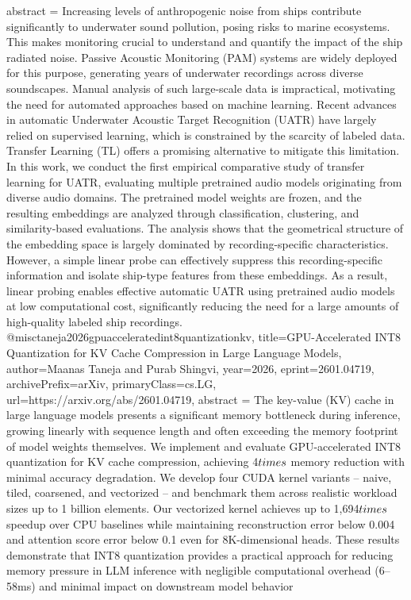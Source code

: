 {      abstract = {Increasing levels of anthropogenic noise from ships contribute significantly to underwater sound pollution, posing risks to marine ecosystems. This makes monitoring crucial to understand and quantify the impact of the ship radiated noise. Passive Acoustic Monitoring (PAM) systems are widely deployed for this purpose, generating years of underwater recordings across diverse soundscapes. Manual analysis of such large-scale data is impractical, motivating the need for automated approaches based on machine learning. Recent advances in automatic Underwater Acoustic Target Recognition (UATR) have largely relied on supervised learning, which is constrained by the scarcity of labeled data. Transfer Learning (TL) offers a promising alternative to mitigate this limitation. In this work, we conduct the first empirical comparative study of transfer learning for UATR, evaluating multiple pretrained audio models originating from diverse audio domains. The pretrained model weights are frozen, and the resulting embeddings are analyzed through classification, clustering, and similarity-based evaluations. The analysis shows that the geometrical structure of the embedding space is largely dominated by recording-specific characteristics. However, a simple linear probe can effectively suppress this recording-specific information and isolate ship-type features from these embeddings. As a result, linear probing enables effective automatic UATR using pretrained audio models at low computational cost, significantly reducing the need for a large amounts of high-quality labeled ship recordings.}
}@misc{taneja2026gpuacceleratedint8quantizationkv,
      title={GPU-Accelerated INT8 Quantization for KV Cache Compression in Large Language Models}, 
      author={Maanas Taneja and Purab Shingvi},
      year={2026},
      eprint={2601.04719},
      archivePrefix={arXiv},
      primaryClass={cs.LG},
      url={https://arxiv.org/abs/2601.04719},
      abstract = {The key-value (KV) cache in large language models presents a significant memory bottleneck during inference, growing linearly with sequence length and often exceeding the memory footprint of model weights themselves. We implement and evaluate GPU-accelerated INT8 quantization for KV cache compression, achieving 4$\\times$ memory reduction with minimal accuracy degradation. We develop four CUDA kernel variants -- naive, tiled, coarsened, and vectorized -- and benchmark them across realistic workload sizes up to 1 billion elements. Our vectorized kernel achieves up to 1,694$\\times$ speedup over CPU baselines while maintaining reconstruction error below 0.004 and attention score error below 0.1 even for 8K-dimensional heads. These results demonstrate that INT8 quantization provides a practical approach for reducing memory pressure in LLM inference with negligible computational overhead (6--58ms) and minimal impact on downstream model behavior}
}
